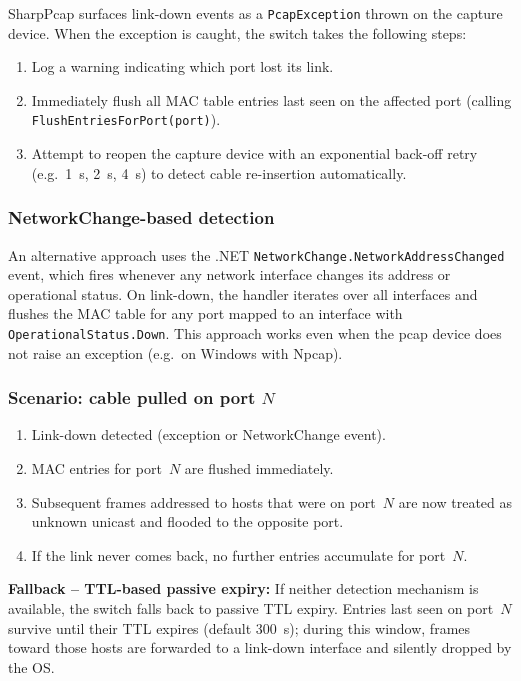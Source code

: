 \documentclass[12pt,a4paper]{article}
\begin{document}
SharpPcap surfaces link-down events as a \texttt{PcapException} thrown on the
capture device.  When the exception is caught, the switch takes the following
steps:

\begin{enumerate}[noitemsep]
  \item Log a warning indicating which port lost its link.
  \item Immediately flush all MAC table entries last seen on the affected port
    (calling \texttt{FlushEntriesForPort(port)}).
  \item Attempt to reopen the capture device with an exponential back-off retry
    (e.g.\ 1~s, 2~s, 4~s) to detect cable re-insertion automatically.
\end{enumerate}

\subsubsection{NetworkChange-based detection}

An alternative approach uses the .NET \texttt{NetworkChange.NetworkAddress\-Changed}
event, which fires whenever any network interface changes its address or
operational status.  On link-down, the handler iterates over all interfaces and
flushes the MAC table for any port mapped to an interface with
\texttt{OperationalStatus.Down}.  This approach works even when the pcap device
does not raise an exception (e.g.\ on Windows with Npcap).

\subsubsection{Scenario: cable pulled on port $N$}

\begin{enumerate}[noitemsep]
  \item Link-down detected (exception or NetworkChange event).
  \item MAC entries for port~$N$ are flushed immediately.
  \item Subsequent frames addressed to hosts that were on port~$N$ are now
    treated as unknown unicast and flooded to the opposite port.
  \item If the link never comes back, no further entries accumulate for port~$N$.
\end{enumerate}

\textbf{Fallback -- TTL-based passive expiry:}  If neither detection mechanism
is available, the switch falls back to passive TTL expiry.  Entries last seen on
port~$N$ survive until their TTL expires (default 300~s); during this window,
frames toward those hosts are forwarded to a link-down interface and silently
dropped by the OS.
\end{document}
